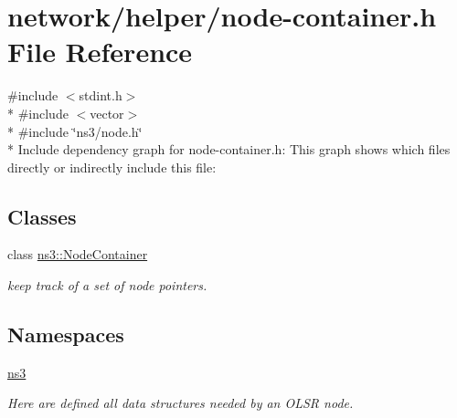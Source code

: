 \hypertarget{node-container_8h}{}\section{network/helper/node-\/container.h File Reference}
\label{node-container_8h}
{\ttfamily \#include $<$stdint.\+h$>$}\\*
{\ttfamily \#include $<$vector$>$}\\*
{\ttfamily \#include \char`\"{}ns3/node.\+h\char`\"{}}\\*
Include dependency graph for node-\/container.h\+:
This graph shows which files directly or indirectly include this file\+:
\subsection*{Classes}
\begin{DoxyCompactItemize}
\item 
class \hyperlink{classns3_1_1NodeContainer}{ns3\+::\+Node\+Container}
\begin{DoxyCompactList}\small\item\em keep track of a set of node pointers. \end{DoxyCompactList}\end{DoxyCompactItemize}
\subsection*{Namespaces}
\begin{DoxyCompactItemize}
\item 
 \hyperlink{namespacens3}{ns3}
\begin{DoxyCompactList}\small\item\em Here are defined all data structures needed by an O\+L\+SR node. \end{DoxyCompactList}\end{DoxyCompactItemize}
